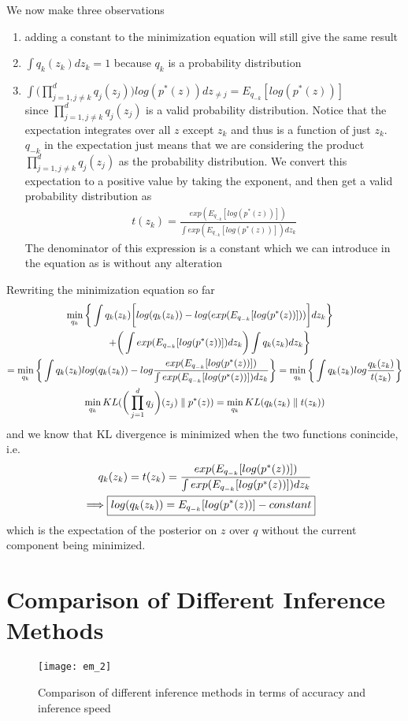 \documentclass[../statistical_learning_notes.tex]{subfiles}
\begin{document}
We now make three observations
\begin{enumerate}
    \item adding a constant to the minimization equation will still give the same result
    \item $\int q_{k}(z_{k}) dz_{k} = 1$ because $q_{k}$ is a probability distribution
    \item $\int \bigg(\prod_{j=1,j\neq k}^{d}q_{j}(z_{j})\bigg) log(p^{*}(z)) dz_{\neq j} = E_{q_{-k}}[log(p^{*}(z))]$\\
    since $\prod_{j=1,j\neq k}^{d}q_{j}(z_{j})$ is a valid probability distribution. Notice that the expectation integrates over all $z$ except $z_{k}$ and thus is a function of just $z_{k}$. $q_{-k}$ in the expectation just means that we are considering the product $\prod_{j=1,j\neq k}^{d} q_{j}(z_{j})$ as the probability distribution. We convert this expectation to a positive value by taking the exponent, and then get a valid probability distribution as
    \begin{gather*}
        t(z_{k}) = \frac{exp(E_{q_{-k}}[log(p^{*}(z))])}{\int exp(E_{q_{-k}}[log(p^{*}(z))]) dz_{k}}
    \end{gather*}
    The denominator of this expression is a constant which we can introduce in the equation as is without any alteration
\end{enumerate}

Rewriting the minimization equation so far
\begin{gather*}
    \min_{q_{k}} \bigg\{ \int q_{k}(z_{k}) \bigg[ log(q_{k}(z_{k})) - log(exp(E_{q_{-k}}[log(p^{*}(z))])) \bigg] dz_{k} \bigg\} \quad\\ \quad+ \bigg( \int exp(E_{q_{-k}}[log(p^{*}(z))]) dz_{k} \bigg) \int q_{k}(z_{k}) dz_{k} \bigg\}\\
    = \min_{q_{k}} \bigg\{ \int q_{k}(z_{k}) log(q_{k}(z_{k})) - log\frac{exp(E_{q_{-k}}[log(p^{*}(z))])}{\int exp(E_{q_{-k}}[log(p^{*}(z))]) dz_{k}} \bigg\}
    = \min_{q_{k}}\bigg\{\int q_{k}(z_{k}) log\frac{q_{k}(z_{k})}{t(z_{k})}  \bigg\}\\
    \min_{q_{k}} KL(\bigg(\prod_{j=1}^{d}q_{j} \bigg)(z_{j}) \parallel p^{*}(z)) = \min_{q_{k}} KL(q_{k}(z_{k}) \parallel t(z_{k}))\\
\end{gather*}
and we know that KL divergence is minimized when the two functions conincide, i.e.
\begin{align*}
    q_{k}(z_{k}) = t(z_{k}) = \frac{exp(E_{q_{-k}}[log(p^{*}(z))])}{\int exp(E_{q_{-k}}[log(p^{*}(z))]) dz_{k}}\\
    \implies \Aboxed{log(q_{k}(z_{k})) = E_{q_{-k}}[log(p^{*}(z))] - constant}
\end{align*}
which is the expectation of the posterior on $z$ over $q$ without the current component being minimized.

\section*{Comparison of Different Inference Methods}
\begin{figure}[h]
\texttt{[image: em\_2]}
\centering
\caption{Comparison of different inference methods in terms of accuracy and inference speed}
\label{fig:em_2} %
\end{figure}
\end{document}
